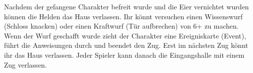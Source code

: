 
Nachdem der gefangene Charakter befreit wurde und die Eier vernichtet wurden können die Helden das Haus verlassen. Ihr könnt versuchen einen Wissenswurf (Schloss knacken) oder einen
Kraftwurf (Tür aufbrechen) von 6+ zu machen. Wenn der Wurf geschafft wurde zieht der Charakter eine Ereigniskarte (Event), führt die Anweisungen durch und beendet den Zug. Erst im nächsten Zug könnt ihr das Haus verlassen.
Jeder Spieler kann danach die Eingangshalle mit einem Zug verlassen.



